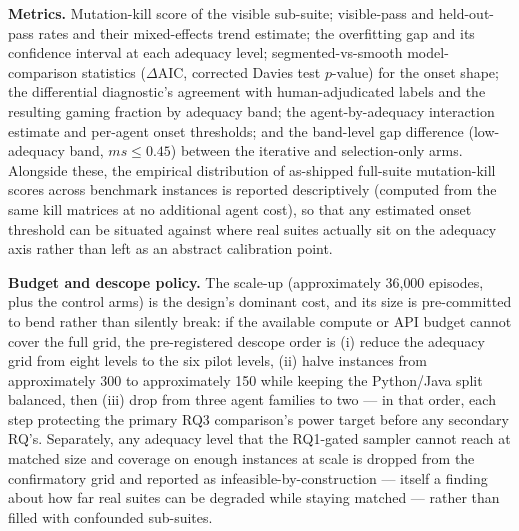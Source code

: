 \documentclass[11pt]{article}
\begin{document}
\textbf{Metrics.} Mutation-kill score of the visible sub-suite; visible-pass and held-out-pass rates and their mixed-effects trend estimate; the overfitting gap and its confidence interval at each adequacy level; segmented-vs-smooth model-comparison statistics ($\Delta$AIC, corrected Davies test $p$-value) for the onset shape; the differential diagnostic's agreement with human-adjudicated labels and the resulting gaming fraction by adequacy band; the agent-by-adequacy interaction estimate and per-agent onset thresholds; and the band-level gap difference (low-adequacy band, $ms \le 0.45$) between the iterative and selection-only arms. Alongside these, the empirical distribution of as-shipped full-suite mutation-kill scores across benchmark instances is reported descriptively (computed from the same kill matrices at no additional agent cost), so that any estimated onset threshold can be situated against where real suites actually sit on the adequacy axis rather than left as an abstract calibration point.

\textbf{Budget and descope policy.} The scale-up (approximately 36{,}000 episodes, plus the control arms) is the design's dominant cost, and its size is pre-committed to bend rather than silently break: if the available compute or API budget cannot cover the full grid, the pre-registered descope order is (i) reduce the adequacy grid from eight levels to the six pilot levels, (ii) halve instances from approximately 300 to approximately 150 while keeping the Python/Java split balanced, then (iii) drop from three agent families to two --- in that order, each step protecting the primary RQ3 comparison's power target before any secondary RQ's. Separately, any adequacy level that the RQ1-gated sampler cannot reach at matched size and coverage on enough instances at scale is dropped from the confirmatory grid and reported as infeasible-by-construction --- itself a finding about how far real suites can be degraded while staying matched --- rather than filled with confounded sub-suites.
\end{document}
